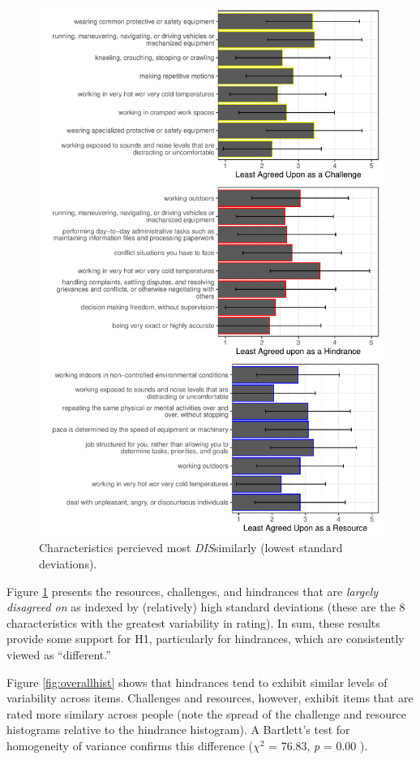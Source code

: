 \documentclass[
  english,
  man]{apa6}
\begin{document}
\begin{figure}
\centering
\includegraphics{Submission_files/figure-latex/combinegraphs2-1.pdf}
\caption{\label{fig:combinegraphs2}Characteristics percieved most \emph{DIS}similarly (lowest standard deviations).}
\end{figure}

Figure \ref{fig:combinegraphs2} presents the resources, challenges, and hindrances that are \emph{largely disagreed on} as indexed by (relatively) high standard deviations (these are the 8 characteristics with the greatest variability in rating). In sum, these results provide some support for H1, particularly for hindrances, which are consistently viewed as ``different.''

Figure \ref{fig:overallhist} shows that hindrances tend to exhibit similar levels of variability across items. Challenges and resources, however, exhibit items that are rated more similary across people (note the spread of the challenge and resource histograms relative to the hindrance histogram). A Bartlett's test for homogeneity of variance confirms this difference (\(\chi^2_{}\) = 76.83, \emph{p} = 0.00 ).
\end{document}
